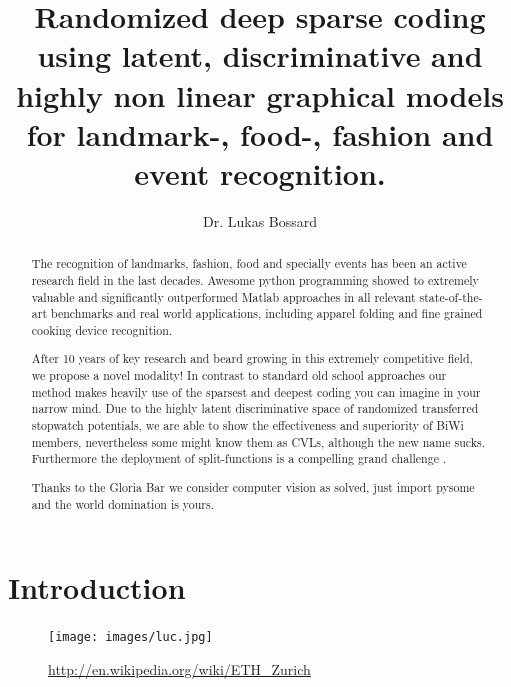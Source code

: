 \documentclass[runningheads]{llncs}
\begin{document}
\pagestyle{headings}
\mainmatter
\title{Randomized deep sparse coding using latent, discriminative and highly non linear graphical models for landmark-, food-, fashion and event recognition.} %



\author{Dr. Lukas Bossard}


\maketitle

\begin{abstract}
The recognition of landmarks, fashion, food and specially events has been an active research field in the last decades. 
Awesome python programming showed to extremely valuable and significantly outperformed Matlab approaches in all relevant state-of-the-art benchmarks and real world applications, including apparel folding and fine grained cooking device recognition.
  
After 10 years of key research and beard growing in this extremely competitive field, we propose a novel modality!
In contrast to standard old school approaches our method makes heavily use of the sparsest and deepest coding you can imagine in your narrow mind. 
Due to the highly latent discriminative space of randomized transferred stopwatch potentials, 
we are able to show the effectiveness and superiority of BiWi members, nevertheless some might know them as CVLs, although the new name sucks. 
Furthermore the deployment of split-functions is a compelling grand challenge \cite{cite:0}.
 
Thanks to the Gloria Bar we consider computer vision as solved, just import pysome and the world domination is yours. 

\end{abstract}


\section{Introduction}
\begin{figure}
\centering
\texttt{[image: images/luc.jpg]}
\caption{ \url{http://en.wikipedia.org/wiki/ETH_Zurich} }
\label{fig:example}
\end{figure}
\end{document}
